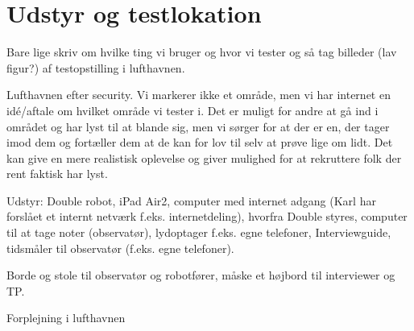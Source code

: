 \section{Udstyr og testlokation}
\label{UdstyrOgTestlokationValgAfGestikker}
%
Bare lige skriv om hvilke ting vi bruger og hvor vi tester og så tag billeder (lav figur?) af testopstilling i lufthavnen. 

Lufthavnen efter security. 
Vi markerer ikke et område, men vi har internet en idé/aftale om hvilket område vi tester i. Det er muligt for andre at gå ind i området og har lyst til at blande sig, men vi sørger for at der er en, der tager imod dem og fortæller dem at de kan for lov til selv at prøve lige om lidt. Det kan give en mere realistisk oplevelse og giver mulighed for at rekruttere folk der rent faktisk har lyst. 

Udstyr: Double robot, iPad Air2, computer med internet adgang (Karl har forslået et internt netværk f.eks. internetdeling), hvorfra Double styres, computer til at tage noter (observatør), lydoptager f.eks. egne telefoner, Interviewguide, tidsmåler til observatør (f.eks. egne telefoner). 

Borde og stole til observatør og robotfører, måske et højbord til interviewer og TP.   

Forplejning i lufthavnen       

